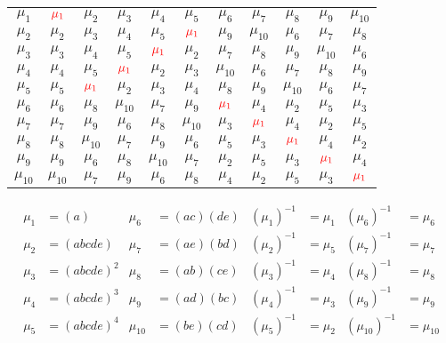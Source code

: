 \documentclass[12pt]{article}
\theoremstyle{definition}
\theoremstyle{remark}
\begin{document}
\begin{enumerate}[leftmargin=*]
\begin{table}[htb]
\begin{tabular}{c|cccccccccc}
    $\mu_1$ & $\mathbin{\textcolor{red}{\mu_1}}$ & $\mu_2$ & $\mu_3$ & $\mu_4$ & $\mu_5$ & $\mu_6$ & $\mu_7$ & $\mu_8$ & $\mu_9$ & $\mu_{10}$ \\
    $\mu_2$ & $\mu_2$ & $\mu_3$ & $\mu_4$ & $\mu_5$ & $\mathbin{\textcolor{red}{\mu_1}}$ & $\mu_9$ & $\mu_{10}$ & $\mu_6$ & $\mu_7$ & $\mu_8$ \\
    $\mu_3$ & $\mu_3$ & $\mu_4$ & $\mu_5$ & $\mathbin{\textcolor{red}{\mu_1}}$ & $\mu_2$ & $\mu_7$ & $\mu_8$ & $\mu_9$ & $\mu_{10}$ & $\mu_6$ \\
    $\mu_4$ & $\mu_4$ & $\mu_5$ & $\mathbin{\textcolor{red}{\mu_1}}$ & $\mu_2$ & $\mu_3$ & $\mu_{10}$ & $\mu_6$ & $\mu_7$ & $\mu_8$ & $\mu_9$ \\
    $\mu_5$ & $\mu_5$ & $\mathbin{\textcolor{red}{\mu_1}}$ & $\mu_2$ & $\mu_3$ & $\mu_4$ & $\mu_8$ & $\mu_9$ & $\mu_{10}$ & $\mu_6$ & $\mu_7$ \\
    $\mu_6$ & $\mu_6$ & $\mu_8$ & $\mu_{10}$ & $\mu_7$ & $\mu_9$ & $\mathbin{\textcolor{red}{\mu_1}}$ & $\mu_4$ & $\mu_2$ & $\mu_5$ & $\mu_3$ \\
    $\mu_7$ & $\mu_7$ & $\mu_9$ & $\mu_6$ & $\mu_8$ & $\mu_{10}$ & $\mu_3$ & $\mathbin{\textcolor{red}{\mu_1}}$ & $\mu_4$ & $\mu_2$ & $\mu_5$ \\
    $\mu_8$ & $\mu_8$ & $\mu_{10}$ & $\mu_7$ & $\mu_9$ & $\mu_6$ & $\mu_5$ & $\mu_3$ & $\mathbin{\textcolor{red}{\mu_1}}$ & $\mu_4$ & $\mu_2$ \\
    $\mu_9$ & $\mu_9$ & $\mu_6$ & $\mu_8$ & $\mu_{10}$ & $\mu_7$ & $\mu_2$ & $\mu_5$ & $\mu_3$ & $\mathbin{\textcolor{red}{\mu_1}}$ & $\mu_4$ \\
    $\mu_{10}$ & $\mu_{10}$ & $\mu_7$ & $\mu_9$ & $\mu_6$ & $\mu_8$ & $\mu_4$ & $\mu_2$ & $\mu_5$ & $\mu_3$ & $\mathbin{\textcolor{red}{\mu_1}}$
    
    \end{tabular}
\end{table}

\begin{align*}
    \mu_1 &= (a) &\mu_6 &=(ac)(de) &(\mu_1)^{-1} &= \mu_1 &(\mu_6)^{-1} &=\mu_6 \\
    \mu_2 &= (abcde) &\mu_7 &=(ae)(bd) &(\mu_2)^{-1} &= \mu_5 &(\mu_7)^{-1} &=\mu_7\\
    \mu_3 &= (abcde)^2 &\mu_8 &= (ab)(ce) &(\mu_3)^{-1} &= \mu_4 &(\mu_8)^{-1} &= \mu_8\\ 
    \mu_4 &= (abcde)^3 &\mu_9 &= (ad)(bc) &(\mu_4)^{-1} &= \mu_3 &(\mu_9)^{-1} &= \mu_9\\
    \mu_5 &= (abcde)^4 &\mu_{10}&=(be)(cd) &(\mu_5)^{-1} &= \mu_2 &(\mu_{10})^{-1}&=\mu_{10}
\end{align*}


\end{enumerate}
\end{document}
